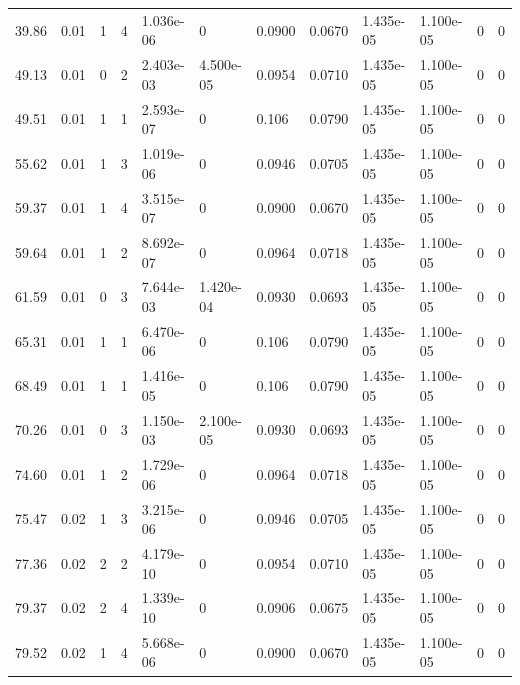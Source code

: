 \documentclass[preview]{standalone}
\begin{document}
{{\begin{tabular}{L{1.2cm}C{1.2cm} C{0.3cm}C{0.5cm} C{1.4cm}C{1.4cm} C{1.4cm}C{1.4cm} C{1.6cm}C{1.6cm} C{1.6cm}C{1.6cm}}
  39.86  &  0.01  & 1     &  4 &  1.036e-06  & 0  &  0.0900&   0.0670& 1.435e-05 & 1.100e-05   &  0 & 0  \\ 
  49.13  &  0.01  & 0     &  2 &  2.403e-03  & 4.500e-05  &  0.0954&   0.0710& 1.435e-05 & 1.100e-05   &  0 & 0  \\ 
  49.51  &  0.01  & 1     &  1 &  2.593e-07  & 0  &  0.106&   0.0790& 1.435e-05 & 1.100e-05   &  0 & 0  \\ 
  55.62  &  0.01  & 1     &  3 &  1.019e-06  & 0  &  0.0946&   0.0705& 1.435e-05 & 1.100e-05   &  0 & 0  \\ 
  59.37  &  0.01  & 1     &  4 &  3.515e-07  & 0  &  0.0900&   0.0670& 1.435e-05 & 1.100e-05   &  0 & 0  \\ 
  59.64  &  0.01  & 1     &  2 &  8.692e-07  & 0  &  0.0964&   0.0718& 1.435e-05 & 1.100e-05   &  0 & 0  \\ 
  61.59  &  0.01  & 0     &  3 &  7.644e-03  & 1.420e-04  &  0.0930&   0.0693& 1.435e-05 & 1.100e-05   &  0 & 0  \\ 
  65.31  &  0.01  & 1     &  1 &  6.470e-06  & 0  &  0.106&   0.0790& 1.435e-05 & 1.100e-05   &  0 & 0  \\ 
  68.49  &  0.01  & 1     &  1 &  1.416e-05  & 0  &  0.106&   0.0790& 1.435e-05 & 1.100e-05   &  0 & 0  \\ 
  70.26  &  0.01  & 0     &  3 &  1.150e-03  & 2.100e-05  &  0.0930&   0.0693& 1.435e-05 & 1.100e-05   &  0 & 0  \\ 
  74.60  &  0.01  & 1     &  2 &  1.729e-06  & 0  &  0.0964&   0.0718& 1.435e-05 & 1.100e-05   &  0 & 0  \\ 
  75.47  &  0.02  & 1     &  3 &  3.215e-06  & 0  &  0.0946&   0.0705& 1.435e-05 & 1.100e-05   &  0 & 0  \\ 
  77.36  &  0.02  & 2     &  2 &  4.179e-10  & 0  &  0.0954&   0.0710& 1.435e-05 & 1.100e-05   &  0 & 0  \\ 
  79.37  &  0.02  & 2     &  4 &  1.339e-10  & 0  &  0.0906&   0.0675& 1.435e-05 & 1.100e-05   &  0 & 0  \\ 
  79.52  &  0.02  & 1     &  4 &  5.668e-06  & 0  &  0.0900&   0.0670& 1.435e-05 & 1.100e-05   &  0 & 0  \\ 
\hline 
\end{tabular} 

}}
\end{document}
